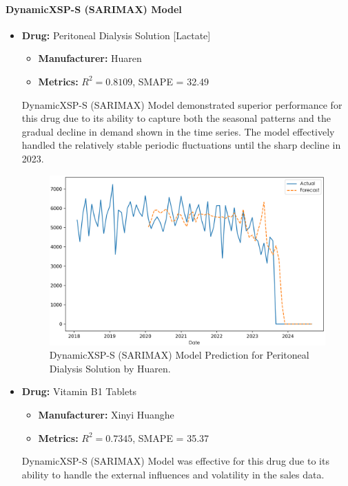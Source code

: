 \documentclass[journal]{IEEEtran}
\begin{document}
\paragraph{DynamicXSP-S (SARIMAX) Model}
\begin{itemize}
\item \textbf{Drug:} Peritoneal Dialysis Solution [Lactate]
\begin{itemize}
\item \textbf{Manufacturer:} Huaren
\item \textbf{Metrics:} $R^2 = 0.8109$, SMAPE = 32.49
\end{itemize}
DynamicXSP-S (SARIMAX) Model demonstrated superior performance for this drug due to its ability to capture both the seasonal patterns and the gradual decline in demand shown in the time series. The model effectively handled the relatively stable periodic fluctuations until the sharp decline in 2023.
\begin{figure}[H]
\centering
\includegraphics[width=\linewidth]{../Result_Paper/SARIMAX_Prediction_腹膜透析液[乳酸盐]_华仁.png}
\caption{DynamicXSP-S (SARIMAX) Model Prediction for Peritoneal Dialysis Solution by Huaren.}
\label{fig:peritoneal}
\end{figure}
\item \textbf{Drug:} Vitamin B1 Tablets
\begin{itemize}
\item \textbf{Manufacturer:} Xinyi Huanghe
\item \textbf{Metrics:} $R^2 = 0.7345$, SMAPE = 35.37
\end{itemize}
DynamicXSP-S (SARIMAX) Model was effective for this drug due to its ability to handle the external influences and volatility in the sales data.
\begin{figure}[H]

\end{figure}
\end{itemize}
\end{document}
